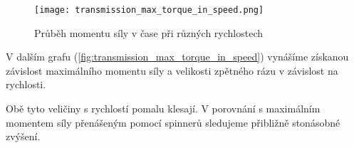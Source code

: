 \raggedright{
    \begin{wrapfigure}{r}{0.55\textwidth}
        \texttt{[image: transmission\_max\_torque\_in\_speed.png]}
        \caption{Průběh momentu síly v čase při různých rychlostech}
        \label{fig:transmission_max_torque_in_speed}
    \end{wrapfigure}
    
    V dalším grafu (\autoref{fig:transmission_max_torque_in_speed}) vynášíme získanou závislost maximálního momentu síly a velikosti zpětného rázu v závislost na rychlosti. 
    
    Obě tyto veličiny s rychlostí pomalu klesají. V porovnání s maximálním momentem síly přenášeným pomocí spinnerů sledujeme přibližně stonásobné zvýšení.
}


